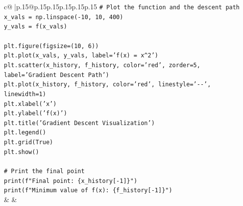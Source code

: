 \documentclass{article}
\begin{document}
{\begin{supertabular}{c@{$\;$}|p{.15\linewidth}@{}p{.15\linewidth}p{.15\linewidth}p{.15\linewidth}p{.15\linewidth}p{.15\linewidth}}
{{{\texttt{\# Plot the function and the descent path} \\
\texttt{x\_vals = np.linspace({-}10, 10, 400)} \\
\texttt{y\_vals = f(x\_vals)} \\
\\ 
\texttt{plt.figure(figsize=(10, 6))} \\
\texttt{plt.plot(x\_vals, y\_vals, label='f(x) = x\^{}2')} \\
\texttt{plt.scatter(x\_history, f\_history, color='red', zorder=5, label='Gradient Descent Path')} \\
\texttt{plt.plot(x\_history, f\_history, color='red', linestyle='{-}{-}', linewidth=1)} \\
\texttt{plt.xlabel('x')} \\
\texttt{plt.ylabel('f(x)')} \\
\texttt{plt.title('Gradient Descent Visualization')} \\
\texttt{plt.legend()} \\
\texttt{plt.grid(True)} \\
\texttt{plt.show()} \\
\\ 
\texttt{\# Print the final point} \\
\texttt{print(f"Final point: \{x\_history{[}{-}1{]}\}")} \\
\texttt{print(f"Minimum value of f(x): \{f\_history{[}{-}1{]}\}")} \\
            }
        }
    }
    & & \\ \\


\end{supertabular}}
\end{document}
